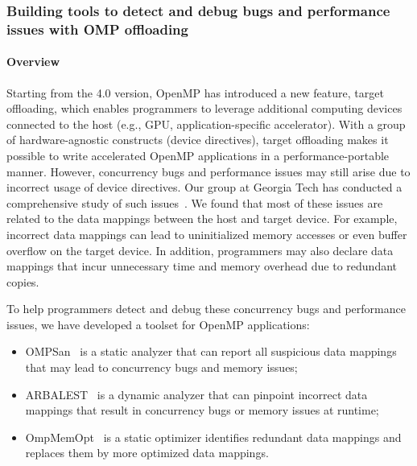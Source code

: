 \subsubsection{ Building tools to detect and debug bugs and performance issues with OMP offloading}

\paragraph{Overview}
Starting from the 4.0 version, OpenMP has introduced a new feature, target offloading, which enables programmers to leverage additional computing devices connected to the host (e.g., GPU, application-specific accelerator).
With a group of hardware-agnostic constructs (device directives), target offloading makes it possible to write accelerated OpenMP applications in a performance-portable manner. However, concurrency bugs and performance issues may still arise due to  incorrect usage of device directives. 
Our group at Georgia Tech has conducted a comprehensive study of such issues~\cite{yu2020study}. We found that most of these issues are related to the data mappings between the host and target device.
For example, incorrect data mappings can lead to uninitialized memory accesses or even buffer overflow on the target device. In addition, programmers may also declare data mappings that incur unnecessary time and memory overhead due to redundant copies.

To help programmers detect and debug these concurrency bugs and performance issues, we have developed a toolset for OpenMP applications:
\begin{itemize}
    \item OMPSan~\cite{barua2019ompsan} is a static analyzer that can report all suspicious data mappings that may lead to concurrency bugs and memory issues;
    \item ARBALEST~\cite{yu2021arbalest} is a dynamic analyzer that can pinpoint incorrect data mappings that result in concurrency bugs or memory issues at runtime;
    \item OmpMemOpt~\cite{barua2020ompmemopt} is a static optimizer identifies redundant data mappings and replaces them by more optimized data mappings.
\end{itemize}


